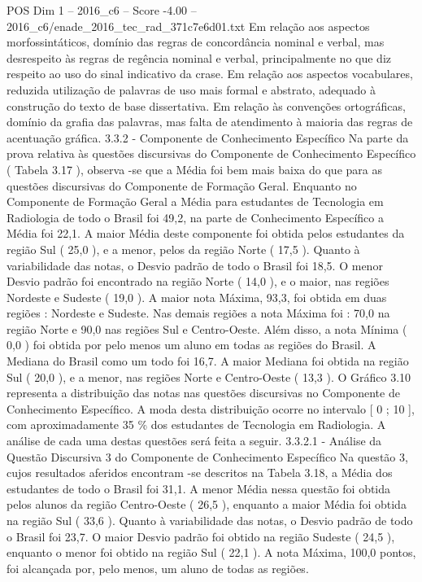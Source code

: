\begin{textsample}{POS Dim 1 – 2016\_c6 – Score -4.00 – 2016\_c6/enade\_2016\_tec\_rad\_371c7e6d01.txt}
Em relação aos aspectos morfossintáticos, domínio das regras de concordância nominal e verbal, mas desrespeito às regras de regência nominal e verbal, principalmente no que diz respeito ao uso do sinal indicativo da crase.
Em relação aos aspectos vocabulares, reduzida utilização de palavras de uso mais formal e abstrato, adequado à construção do texto de base dissertativa.
Em relação às convenções ortográficas, domínio da grafia das palavras, mas falta de atendimento à maioria das regras de acentuação gráfica. 3.3.2 - Componente de Conhecimento Específico Na parte da prova relativa às questões discursivas do Componente de Conhecimento Específico ( Tabela 3.17 ), observa -se que a Média foi bem mais baixa do que para as questões discursivas do Componente de Formação Geral.
Enquanto no Componente de Formação Geral a Média para estudantes de Tecnologia em Radiologia de todo o Brasil foi 49,2, na parte de Conhecimento Específico a Média foi 22,1.
A maior Média deste componente foi obtida pelos estudantes da região Sul ( 25,0 ), e a menor, pelos da região Norte ( 17,5 ).
Quanto à variabilidade das notas, o Desvio padrão de todo o Brasil foi 18,5.
O menor Desvio padrão foi encontrado na região Norte ( 14,0 ), e o maior, nas regiões Nordeste e Sudeste ( 19,0 ).
A maior nota Máxima, 93,3, foi obtida em duas regiões : Nordeste e Sudeste.
Nas demais regiões a nota Máxima foi : 70,0 na região Norte e 90,0 nas regiões Sul e Centro-Oeste.
Além disso, a nota Mínima ( 0,0 ) foi obtida por pelo menos um aluno em todas as regiões do Brasil.
A Mediana do Brasil como um todo foi 16,7.
A maior Mediana foi obtida na região Sul ( 20,0 ), e a menor, nas regiões Norte e Centro-Oeste ( 13,3 ).
O Gráfico 3.10 representa a distribuição das notas nas questões discursivas no Componente de Conhecimento Específico.
A moda desta distribuição ocorre no intervalo [ 0 ; 10 ], com aproximadamente 35 \% dos estudantes de Tecnologia em Radiologia.
A análise de cada uma destas questões será feita a seguir. 3.3.2.1 - Análise da Questão Discursiva 3 do Componente de Conhecimento Específico Na questão 3, cujos resultados aferidos encontram -se descritos na Tabela 3.18, a Média dos estudantes de todo o Brasil foi 31,1.
A menor Média nessa questão foi obtida pelos alunos da região Centro-Oeste ( 26,5 ), enquanto a maior Média foi obtida na região Sul ( 33,6 ).
Quanto à variabilidade das notas, o Desvio padrão de todo o Brasil foi 23,7.
O maior Desvio padrão foi obtido na região Sudeste ( 24,5 ), enquanto o menor foi obtido na região Sul ( 22,1 ).
A nota Máxima, 100,0 pontos, foi alcançada por, pelo menos, um aluno de todas as regiões.

\end{textsample}
